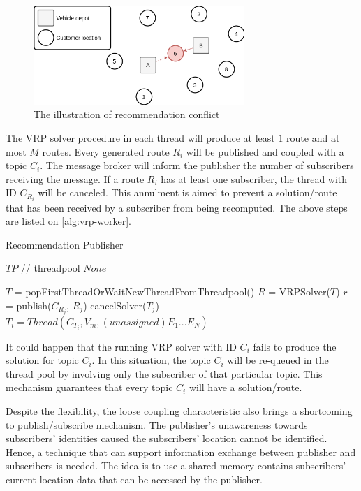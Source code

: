 \documentclass[conference]{IEEEtran}
\begin{document}
\begin{figure}[!]
	\centering
	\includegraphics[width=8cm]{Resources/Images/conflict-illustration}
	\caption{The illustration of recommendation conflict}
	\label{fig:conflict-illustration}
\end{figure} 

The VRP solver procedure in each thread will produce at least $1$ route and at most $M$ routes. Every generated route $R_i$ will be published and coupled with a topic $C_i$. The message broker will inform the publisher the number of subscribers receiving the message. If a route $R_i$ has at least one subscriber, the thread with ID $C_{R_i}$ will be canceled. This annulment is aimed to prevent a solution/route that has been received by a subscriber from being recomputed. The above steps are listed on \autoref{alg:vrp-worker}.

\begin{algorithm}[!]
	\caption{Recommendation Publisher}
	\label{alg:vrp-worker}
	\begin{algorithmic}[1]
		\renewcommand{\algorithmicrequire}{\textbf{Input:}}
		\renewcommand{\algorithmicensure}{\textbf{Output:}}
		\REQUIRE $TP$		// threadpool
		\ENSURE  $None$
		
		\STATE $T$ = popFirstThreadOrWaitNewThreadFromThreadpool()
		\STATE $R$ = VRPSolver($T$)
		\STATE $r$ = publish($C_{R_j}$, $R_j$)
		\STATE cancelSolver($T_j$)
		\STATE $T_i = Thread(C_{T_i}, V_m, (unassigned) E_1...E_N)$
		\ENDIF
		\ENDFOR
		\ENDWHILE	
	\end{algorithmic}
\end{algorithm}

It could happen that the running VRP solver with ID $C_i$ fails to produce the solution for topic $C_i$. In this situation, the topic $C_i$ will be re-queued in the thread pool by involving only the subscriber of that particular topic. This mechanism guarantees that every topic $C_i$ will have a solution/route. 

Despite the flexibility, the loose coupling characteristic also brings a shortcoming to publish/subscribe mechanism. The publisher's unawareness towards subscribers' identities caused the subscribers' location cannot be identified. Hence, a technique that can support information exchange between publisher and subscribers is needed. The idea is to use a shared memory contains subscribers' current location data that can be accessed by the publisher. 
\end{document}
